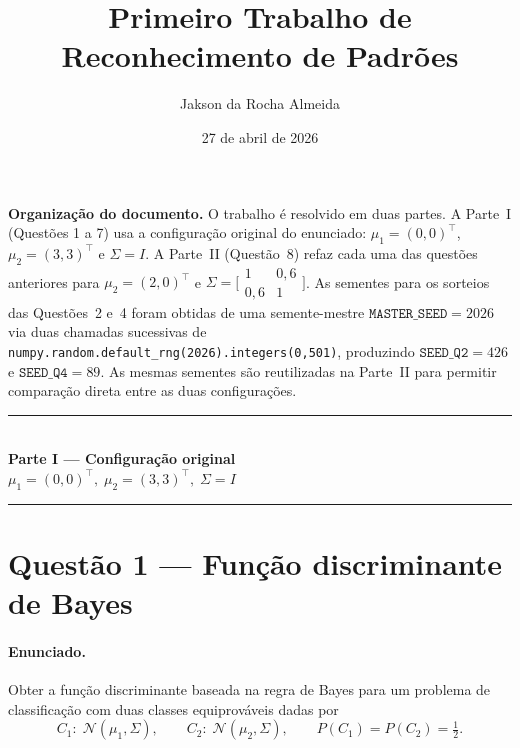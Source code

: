 ﻿\documentclass[12pt,a4paper]{article}
\title{Primeiro Trabalho de Reconhecimento de Padr\~oes}
\author{Jakson da Rocha Almeida}
\date{27 de abril de 2026}
\begin{document}
\maketitle

\noindent\textbf{Organiza\c{c}\~ao do documento.} O trabalho \'e
resolvido em duas partes. A Parte~I (Quest\~oes 1 a 7) usa a
configura\c{c}\~ao original do enunciado:
$\mu_1=(0,0)^\top$, $\mu_2=(3,3)^\top$ e $\Sigma=I$. A Parte~II
(Quest\~ao~8) refaz cada uma das quest\~oes anteriores para
$\mu_2=(2,0)^\top$ e $\Sigma=\bigl[\begin{smallmatrix}1&0{,}6\\0{,}6&1\end{smallmatrix}\bigr]$.
As sementes para os sorteios das Quest\~oes~2 e~4 foram obtidas de uma
semente-mestre $\mathtt{MASTER\_SEED}=2026$ via duas chamadas
sucessivas de \texttt{numpy.random.default\_rng(2026).integers(0,501)},
produzindo $\mathtt{SEED\_Q2}=426$ e $\mathtt{SEED\_Q4}=89$. As mesmas
sementes s\~ao reutilizadas na Parte~II para permitir compara\c{c}\~ao
direta entre as duas configura\c{c}\~oes.

\begin{center}
\rule{0.6\linewidth}{0.4pt}\\[2pt]
\textbf{\large Parte I --- Configura\c{c}\~ao original}\\[-2pt]
\small$\mu_1=(0,0)^\top,\;\mu_2=(3,3)^\top,\;\Sigma=I$\\
\rule{0.6\linewidth}{0.4pt}
\end{center}

\section*{Quest\~ao 1 --- Fun\c{c}\~ao discriminante de Bayes}

\paragraph{Enunciado.} Obter a fun\c{c}\~ao discriminante baseada na
regra de Bayes para um problema de classifica\c{c}\~ao com duas classes
equiprov\'aveis dadas por
\[
C_1:\;\mathcal{N}(\mu_1,\Sigma),\qquad
C_2:\;\mathcal{N}(\mu_2,\Sigma),\qquad
P(C_1)=P(C_2)=\tfrac12.
\]
\end{document}
